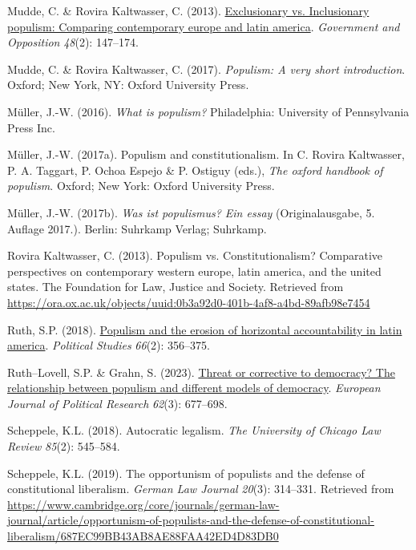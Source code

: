 \documentclass[
  abstract]{article}
\newlength{\cslhangindent}
\newlength{\cslentryspacingunit} %
\newenvironment{CSLReferences}[2] %
 {%
  \setlength{\parindent}{0pt}
  \ifodd #1
  \let\oldpar\par
  \def\par{\hangindent=\cslhangindent\oldpar}
  \fi
  \setlength{\parskip}{#2\cslentryspacingunit}
 }%
 {}
\begin{document}
\begin{CSLReferences}{1}{0}
\leavevmode{}%
Mudde, C. \& Rovira Kaltwasser, C. (2013).
\href{https://doi.org/10.1017/gov.2012.11}{Exclusionary vs. Inclusionary
populism: Comparing contemporary europe and latin america}.
\emph{Government and Opposition} \emph{48}(2): 147--174.

\leavevmode{}%
Mudde, C. \& Rovira Kaltwasser, C. (2017). \emph{Populism: A very short
introduction}. Oxford; New York, NY: {Oxford University Press}.

\leavevmode{}%
Müller, J.-W. (2016). \emph{What is populism?} Philadelphia: {University
of Pennsylvania Press Inc}.

\leavevmode{}%
Müller, J.-W. (2017a). Populism and constitutionalism. In C. Rovira
Kaltwasser, P. A. Taggart, P. Ochoa Espejo \& P. Ostiguy (eds.),
\emph{The oxford handbook of populism}. Oxford; New York: {Oxford
University Press}.

\leavevmode{}%
Müller, J.-W. (2017b). \emph{Was ist populismus? Ein essay}
(Originalausgabe, 5. Auflage 2017.). Berlin: {Suhrkamp Verlag};
Suhrkamp.

\leavevmode{}%
Rovira Kaltwasser, C. (2013). Populism vs. Constitutionalism?
Comparative perspectives on contemporary western europe, latin america,
and the united states. {The Foundation for Law, Justice and Society}.
Retrieved from
\url{https://ora.ox.ac.uk/objects/uuid:0b3a92d0-401b-4af8-a4bd-89afb98e7454}

\leavevmode{}%
Ruth, S.P. (2018).
\href{https://doi.org/10.1177/0032321717723511}{Populism and the erosion
of horizontal accountability in latin america}. \emph{Political Studies}
\emph{66}(2): 356--375.

\leavevmode{}%
Ruth--Lovell, S.P. \& Grahn, S. (2023).
\href{https://doi.org/10.1111/1475-6765.12564}{Threat or corrective to
democracy? The relationship between populism and different models of
democracy}. \emph{European Journal of Political Research} \emph{62}(3):
677--698.

\leavevmode{}%
Scheppele, K.L. (2018). Autocratic legalism. \emph{The University of
Chicago Law Review} \emph{85}(2): 545--584.

\leavevmode{}%
Scheppele, K.L. (2019). The opportunism of populists and the defense of
constitutional liberalism. \emph{German Law Journal} \emph{20}(3):
314--331. Retrieved from
\url{https://www.cambridge.org/core/journals/german-law-journal/article/opportunism-of-populists-and-the-defense-of-constitutional-liberalism/687EC99BB43AB8AE88FAA42ED4D83DB0}


\end{CSLReferences}
\end{document}
